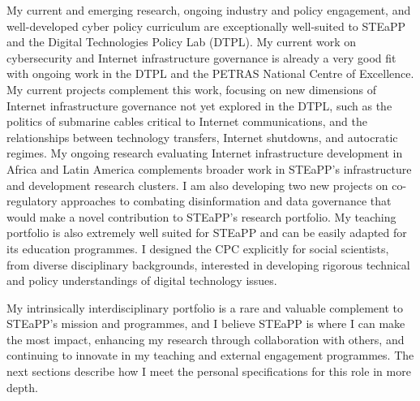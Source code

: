 \documentclass[11pt]{letter}
\begin{document}
\begin{letter}
My current and emerging research, ongoing industry and policy engagement, and well-developed cyber policy curriculum are exceptionally well-suited to STEaPP and the Digital Technologies Policy Lab (DTPL).
%
My current work on cybersecurity and Internet infrastructure governance is already a very good fit with ongoing work in the DTPL and the PETRAS National Centre of Excellence. 
%
My current projects complement this work, focusing on new dimensions of Internet infrastructure governance not yet explored in the DTPL, such as the politics of submarine cables critical to Internet communications, and the relationships between technology transfers, Internet shutdowns, and autocratic regimes. 
%
My ongoing research evaluating Internet infrastructure development in Africa and Latin America complements broader work in STEaPP’s infrastructure and development research clusters.
%
I am also developing two new projects on co-regulatory approaches to combating disinformation and data governance that would make a novel contribution to STEaPP’s research portfolio. 
%
My teaching portfolio is also extremely well suited for STEaPP and can be easily adapted for its education programmes.
%
%
I designed the CPC explicitly for social scientists, from diverse disciplinary backgrounds, interested in developing rigorous technical and policy understandings of digital technology issues.
%
%
%

My intrinsically interdisciplinary portfolio is a rare and valuable complement to STEaPP's mission and programmes, and I believe STEaPP is where I can make the most impact, enhancing my research through collaboration with others, and continuing to innovate in my teaching and external engagement programmes.
%
The next sections describe how I meet the personal specifications for this role in more depth. 





\end{letter}
\end{document}
